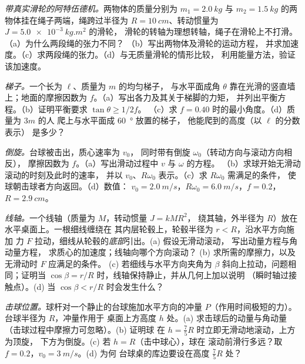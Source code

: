 \begin{exercise}[$\star\star$]\label{exo:b2:rigid-body-mechanics:7}
\emph{带真实滑轮的阿特伍德机。}两物体的质量分别为 $m_1 = \qty{2.0}{kg}$
与 $m_2 = \qty{1.5}{kg}$ 的两物体挂在绳子两端，绳跨过半径为 $R =
\qty{10}{cm}$、转动惯量为 $J = \qty{5.0e-3}{kg.m^2}$ 的滑轮，
滑轮的转轴为理想转轴，绳子在滑轮上不打滑。（a）为什么两段绳的张力不同？
（b）写出两物体及滑轮的运动方程，
并求加速度。（c）求两段绳的张力。（d）与无质量滑轮的情形比较，
利用能量方法，验证该加速度。
\end{exercise}

\begin{exercise}[$\star\star$]\label{exo:b2:rigid-body-mechanics:8}
\emph{梯子。}一个长为 $\ell$、质量为 $m$ 的均匀梯子，
与水平面成角 $\theta$ 靠在光滑的竖直墙上；地面的摩擦因数为 $f$。（a）写出各力及其关于梯脚的力矩，
并列出平衡方程。（b）证明平衡要求 $\tan\theta \ge 1/2f$。
（c）求 $f = 0.40$ 时的最小角度。（d）质量为 $3m$ 的人
爬上与水平面成 \qty{60}{\degree} 放置的梯子，
他能爬到的高度（以 $\ell$ 的分数表示）
是多少？
\end{exercise}

\begin{exercise}[$\star\star$]\label{exo:b2:rigid-body-mechanics:9}
\emph{倒旋。}台球被击出，质心速率为 $v_0$，
同时带有倒旋 $\omega_0$（转动方向与滚动方向相反），
摩擦因数为 $f$。（a）写出滑动过程中 $v$ 与 $\omega$ 的方程。
（b）求球开始无滑动滚动的时刻及此时的速率，
并以 $v_0$、$R\omega_0$ 表示。（c）求 $R\omega_0$ 需满足的条件，
使球朝击球者方向返回。（d）数值：
$v_0 = \qty{2.0}{m/s}$，$R\omega_0 = \qty{6.0}{m/s}$，$f = 0.2$，
$R = \qty{2.9}{cm}$。
\end{exercise}

\begin{exercise}[$\star\star\star$]\label{exo:b2:rigid-body-mechanics:10}
\emph{线轴。}一个线轴（质量为 $M$，转动惯量 $J = kMR^2$，
绕其轴，外半径为 $R$）放在水平桌面上。一根细线缠绕在
其内层轮毂上，轮毂半径为 $r < R$，沿水平方向施加
力 $F$ 拉动，细线从轮毂的\emph{底部}引出。(a) 假设无滑动滚动，
写出动量方程与角动量方程，
求质心的加速度；线轴向哪个方向滚动？
(b) 求所需的摩擦力，以及无滑动时 $F$ 应满足的条件。
(c) 若细线与水平方向夹角为
$\beta$ 斜向上拉动，问题相同；证明当
$\cos\beta = r/R$ 时，线轴保持静止，并从几何上加以说明
（瞬时轴过接触点）。(d) 当 $\cos\beta < r/R$ 时会发生什么？
\end{exercise}

\begin{exercise}[$\star\star\star$]\label{exo:b2:rigid-body-mechanics:11}
\emph{击球位置。}球杆对一个静止的台球施加水平方向的冲量
$P$（作用时间极短的力）。台球半径为 $R$，冲量作用于
桌面上方高度 $h$ 处。(a) 求击球后的动量与角动量
（击球过程中摩擦力可忽略）。(b) 证明球
在 $h = \tfrac75R$ 时立即无滑动地滚动，上方为顶旋，
下方为倒旋。(c) 若 $h = R$（击中球心），球在
滚动前滑行多远？取 $f = 0.2$，$v_0 = \qty{3}{m/s}$。(d) 为何
台球桌的库边要设在高度 $\tfrac75R$ 处？
\end{exercise}

